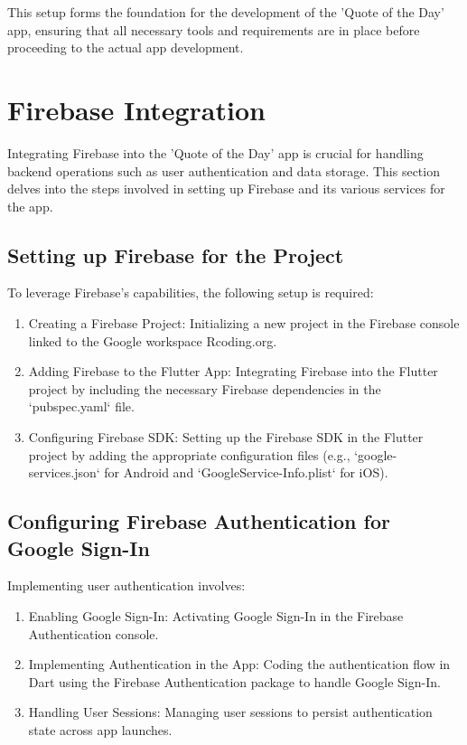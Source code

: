 \documentclass{book}
\begin{document}
This setup forms the foundation for the development of the 'Quote of the Day' app, ensuring that all necessary tools and requirements are in place before proceeding to the actual app development.

\section{Firebase Integration}
Integrating Firebase into the 'Quote of the Day' app is crucial for handling backend operations such as user authentication and data storage. This section delves into the steps involved in setting up Firebase and its various services for the app.

\subsection{Setting up Firebase for the Project}
To leverage Firebase's capabilities, the following setup is required:
\begin{enumerate}
    \item Creating a Firebase Project: Initializing a new project in the Firebase console linked to the Google workspace Rcoding.org.
    \item Adding Firebase to the Flutter App: Integrating Firebase into the Flutter project by including the necessary Firebase dependencies in the `pubspec.yaml` file.
    \item Configuring Firebase SDK: Setting up the Firebase SDK in the Flutter project by adding the appropriate configuration files (e.g., `google-services.json` for Android and `GoogleService-Info.plist` for iOS).
\end{enumerate}

\subsection{Configuring Firebase Authentication for Google Sign-In}
Implementing user authentication involves:
\begin{enumerate}
    \item Enabling Google Sign-In: Activating Google Sign-In in the Firebase Authentication console.
    \item Implementing Authentication in the App: Coding the authentication flow in Dart using the Firebase Authentication package to handle Google Sign-In.
    \item Handling User Sessions: Managing user sessions to persist authentication state across app launches.
\end{enumerate}
\end{document}

